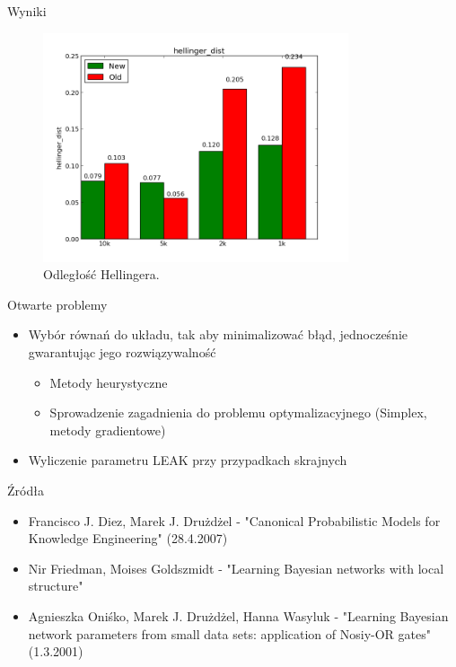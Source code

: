 \documentclass{beamer}
\begin{document}
\begin{frame}{Wyniki}
	\begin{figure}[h!]
		\centering
		\includegraphics[width=9cm]{hellinger_dist.png}
		\caption{Odległość Hellingera.}
	\end{figure}
\end{frame}

\begin{frame}{Otwarte problemy}
    \begin{itemize}
        \item Wybór równań do układu, tak aby minimalizować błąd, jednocześnie gwarantując jego rozwiązywalność
        \begin{itemize}
            \item Metody heurystyczne
            \item Sprowadzenie zagadnienia do problemu optymalizacyjnego (Simplex, metody gradientowe)
        \end{itemize}
        \item Wyliczenie parametru LEAK przy przypadkach skrajnych
    \end{itemize}
\end{frame}


\begin{frame}{Źródła}
	\begin{itemize}
		\item Francisco J. Diez, Marek J. Drużdżel - "Canonical Probabilistic Models for Knowledge Engineering" (28.4.2007)
		\item Nir Friedman, Moises Goldszmidt - "Learning Bayesian networks with local structure"
		\item Agnieszka Oniśko, Marek J. Drużdżel, Hanna Wasyluk - "Learning Bayesian network parameters from small data sets: application of Nosiy-OR gates" (1.3.2001)
	\end{itemize}
\end{frame}
\end{document}
